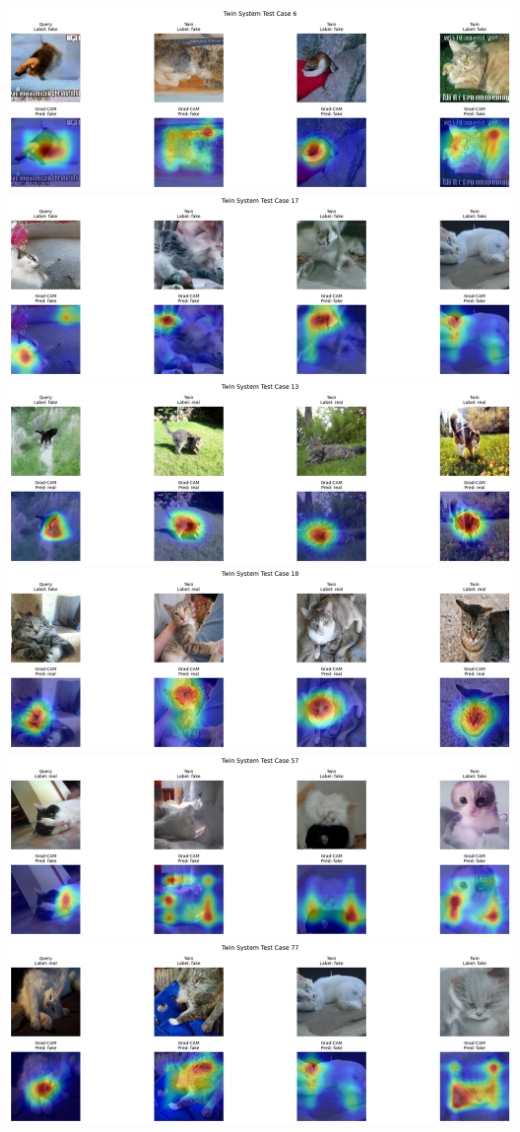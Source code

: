 \documentclass{article}
\begin{document}
\includegraphics[width=0.9\linewidth]{img/twin_vis_test6.png}\\
\includegraphics[width=0.9\linewidth]{img/twin_vis_test17.png}\\
\includegraphics[width=0.9\linewidth]{img/twin_vis_test13.png}\\
\includegraphics[width=0.9\linewidth]{img/twin_vis_test18.png}\\
\includegraphics[width=0.9\linewidth]{img/twin_vis_test57.png}\\
\includegraphics[width=0.9\linewidth]{img/twin_vis_test77.png}
\end{document}
